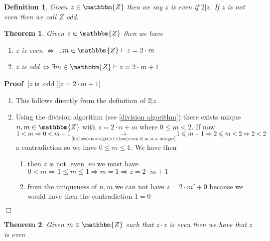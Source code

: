 \documentclass{book}
\newcommand{\Rightarrowlim}{\mathop{\rightarrow}\limits}
\newcommand{\tmop}[1]{\ensuremath{\operatorname{#1}}}
\newcommand{\um}{-}
\newcommand{\upl}{+}
\newenvironment{proof}{\noindent\textbf{Proof\ }}{\hspace*{\fill}$\Box$\medskip}
\newtheorem{definition}{Definition}
{\theorembodyfont{\rmfamily}\newtheorem{example}{Example}}
\newtheorem{theorem}{Theorem}
\begin{document}
{{\begin{definition}
  \label{even and odd}{}{}Given $z \in
  \mathbbm{Z}$ then we say $z$ is even if $2| z$. If $z$ is not even then we
  call $Z$ odd.
\end{definition}

\begin{theorem}
  Given $z \in \mathbbm{Z}$ then we have
  \begin{enumerate}
    \item $z$ is even $\Leftrightarrow$ $\exists m \in \mathbbm{Z} \vdash z =
    2 \cdot m$
    
    \item $z$ is odd $\Leftrightarrow \exists m \in \mathbbm{Z} \vdash z = 2
    \cdot m \upl 1$
  \end{enumerate}
\end{theorem}

\begin{proof}[$z \tmop{is} \tmop{odd}$][$z = 2 \cdot m \upl 1$]
  
  \begin{enumerate}
    \item This follows directly from the definition of $2| z$
    
    \item Using the division algorithm (see \ref{division algorithm}) there
    exists unique $n, m \in \mathbbm{Z}$ with $z = 2 \cdot n \upl m$ where $0
    \leqslant m < 2$. If now $1 < m \Rightarrow 0 < m \um 1
    \Rightarrowlim_{\text{\ref{0<less>m=<gtr>1<less>=m if m is a integer}}} 1
    \leqslant m \um 1 \Rightarrow 2 \leqslant m < 2 \Rightarrow 2 < 2$ a
    contradiction so we have $0 \leqslant m \leqslant 1$. We have then
    \begin{enumerate}
      \item then $z$ is not $\tmop{even}$ so we must have $0 < m \Rightarrow 1
      \leqslant m \leqslant 1 \Rightarrow m = 1 \Rightarrow z = 2 \cdot m \upl
      1$
      
      \item from the uniqueness of $n, m$ we can not have $z = 2 \cdot m' \upl
      0$ because we would have then the contradiction $1 = 0$
    \end{enumerate}
  \end{enumerate}
\end{proof}

\begin{theorem}
  \label{m*m is even then m is even}Given $m \in \mathbbm{Z}$ such that $z
  \cdot z$ is even then we have that $z$ is even
\end{theorem}

}}
\end{document}
